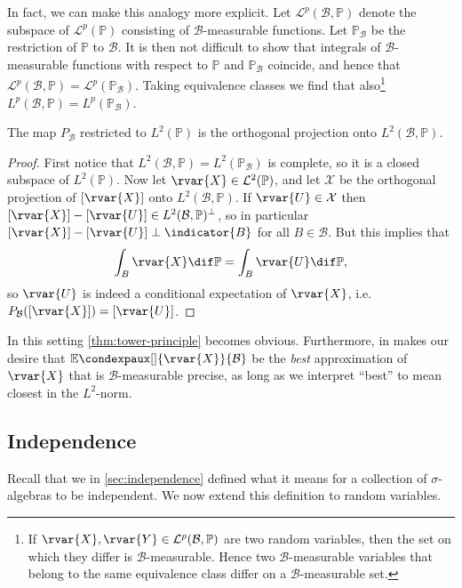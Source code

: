 \documentclass[article, a4paper, 11pt, oneside]{memoir}
\numberwithin{equation}{chapter}
\newcommand{\calB}{\mathcal{B}}
\newcommand{\calL}{\mathcal{L}}
\renewcommand{\P}{\mathbb{P}}
\newcommand{\condexp}[3][]{{\mathbb{E}\condexpaux[#1]{#2}{#3}}}
\begin{document}
In fact, we can make this analogy more explicit. Let $\calL^p(\calB,\P)$ denote the subspace of $\calL^p(\P)$ consisting of $\calB$-measurable functions. Let $\P_\calB$ be the restriction of $\P$ to $\calB$. It is then not difficult to show that integrals of $\calB$-measurable functions with respect to $\P$ and $\P_\calB$ coincide, and hence that $\calL^p(\calB,\P) = \calL^p(\P_\calB)$. Taking equivalence classes we find that also\footnote{If $\rvar{X},\rvar{Y} \in \calL^p(\calB,\P)$ are two random variables, then the set on which they differ is $\calB$-measurable. Hence two $\calB$-measurable variables that belong to the same equivalence class differ on a $\calB$-measurable set.} $L^p(\calB,\P) = L^p(\P_\calB)$.

\begin{proposition}
    The map $P_\calB$ restricted to $L^2(\P)$ is the orthogonal projection onto $L^2(\calB,\P)$.
\end{proposition}

\begin{proof}
    First notice that $L^2(\calB,\P) = L^2(\P_\calB)$ is complete, so it is a closed subspace of $L^2(\P)$. Now let $\rvar{X} \in \calL^2(\P)$, and let $\mathcal{X}$ be the orthogonal projection of $[\rvar{X}]$ onto $L^2(\calB,\P)$. If $\rvar{U} \in \mathcal{X}$ then $[\rvar{X}] - [\rvar{U}] \in L^2(\calB,\P)^\perp$, so in particular $[\rvar{X}] - [\rvar{U}] \perp \indicator{B}$ for all $B \in \calB$. But this implies that
    \begin{equation*}
        \int_B \rvar{X} \dif\P
            = \int_B \rvar{U} \dif\P,
    \end{equation*}
    so $\rvar{U}$ is indeed a conditional expectation of $\rvar{X}$, i.e. $P_\calB([\rvar{X}]) = [\rvar{U}]$.
\end{proof}
%
In this setting \cref{thm:tower-principle} becomes obvious. Furthermore, in makes our desire that $\condexp{\rvar{X}}{\calB}$ be the \emph{best} approximation of $\rvar{X}$ that is $\calB$-measurable precise, as long as we interpret \enquote{best} to mean closest in the $L^2$-norm.


\subsection{Independence}

Recall that we in \cref{sec:independence} defined what it means for a collection of $\sigma$-algebras to be independent. We now extend this definition to random variables.
\end{document}
